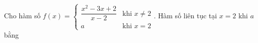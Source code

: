\begin{ex}
Cho hàm số $f(x)=\begin{cases}\dfrac{x^2-3x+2}{x-2}&\text{khi }x\ne2\\a&\text{khi }x=2\end{cases}$. Hàm số liên tục tại $x=2$ khi $a$ bằng
\end{ex}
